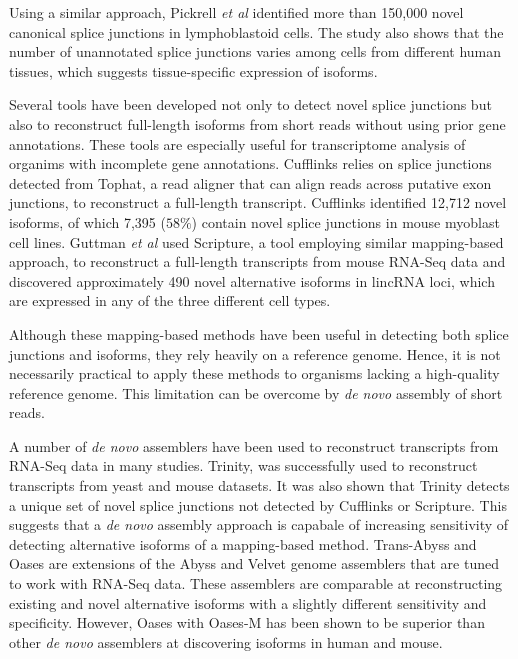 \documentclass[10pt]{article}
\begin{document}
Using a similar approach, Pickrell {\em et al} identified more than
150,000 novel canonical splice junctions in lymphoblastoid cells.  The
study also shows that the number of unannotated splice junctions
varies among cells from different human tissues, which suggests
tissue-specific expression of isoforms\cite{Pickrell:2010gt}. 

Several tools have been developed not only to detect novel splice
junctions but also to reconstruct full-length isoforms from short
reads without using prior gene annotations.  These tools are especially
useful for transcriptome analysis of organims with incomplete gene
annotations.  Cufflinks\cite{Trapnell:2010kd} relies on splice
junctions detected from Tophat\cite{Trapnell:2009dp}, a read aligner
that can align reads across putative exon junctions, to reconstruct a
full-length transcript.  Cufflinks identified 12,712 novel isoforms,
of which 7,395 ($58\%$) contain novel splice junctions in mouse
myoblast cell lines.  Guttman {\em et al} used Scripture, a tool
employing similar mapping-based approach, to reconstruct a full-length
transcripts from mouse RNA-Seq data and discovered approximately 490
novel alternative isoforms in lincRNA loci, which are expressed in any
of the three different cell types\cite{Guttman:2010io}.

Although these mapping-based methods have been useful in detecting
both splice junctions and isoforms, they rely heavily on a reference
genome.  Hence, it is not necessarily practical to apply these methods
to organisms lacking a high-quality reference genome.  This limitation
can be overcome by {\em de novo} assembly of short reads.

A number of {\em de novo} assemblers have been used to reconstruct
transcripts from RNA-Seq data in many studies.
Trinity\cite{Grabherr:2011jb}, was successfully used to reconstruct
transcripts from yeast and mouse datasets.  It was also shown that
Trinity detects a unique set of novel splice junctions not detected by
Cufflinks or Scripture.  This suggests that a {\em de novo} assembly
approach is capabale of increasing sensitivity of detecting
alternative isoforms of a mapping-based method.
Trans-Abyss\cite{Robertson:2010ih} and Oases\cite{Schulz:2012je} are
extensions of the Abyss\cite{Simpson:2009iv} and
Velvet\cite{Zerbino:2008vu,Zerbino:2009jp} genome assemblers that are
tuned to work with RNA-Seq data.  These assemblers are comparable at
reconstructing existing and novel alternative isoforms with a slightly
different sensitivity and specificity.  However, Oases with Oases-M
has been shown to be superior than other {\em de novo} assemblers at
discovering isoforms in human and mouse\cite{Schulz:2012je}.
\end{document}
